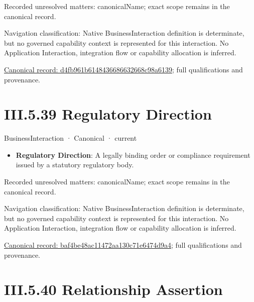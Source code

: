 {\small Recorded unresolved matters: canonicalName; exact scope remains in the canonical record.}\par
{\small Navigation classification: Native BusinessInteraction definition is determinate, but no governed capability context is represented for this interaction. No Application Interaction, integration flow or capability allocation is inferred.}\par
{\footnotesize \href{../../../../../../../../continuum/business/business-interaction/d4fb961b6148436686632668c98a6139.md}{Canonical record: d4fb961b6148436686632668c98a6139}; full qualifications and provenance.}\par
\section*{III.5.39 Regulatory Direction}
\label{navigation:III.5.39}

\label{element:baf4be48ac11472aa130c71e6474d9a4}
{\small BusinessInteraction · Canonical · current}\par

\begin{itemize}


\item \textbf{Regulatory Direction}: A legally binding order or compliance requirement issued by a statutory regulatory body.

\end{itemize}

{\small Recorded unresolved matters: canonicalName; exact scope remains in the canonical record.}\par
{\small Navigation classification: Native BusinessInteraction definition is determinate, but no governed capability context is represented for this interaction. No Application Interaction, integration flow or capability allocation is inferred.}\par
{\footnotesize \href{../../../../../../../../continuum/business/business-interaction/baf4be48ac11472aa130c71e6474d9a4.md}{Canonical record: baf4be48ac11472aa130c71e6474d9a4}; full qualifications and provenance.}\par
\section*{III.5.40 Relationship Assertion}
\label{navigation:III.5.40}

